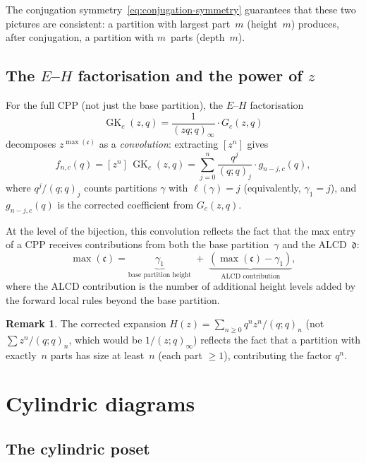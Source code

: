 \documentclass[11pt]{article}
\newcommand{\GK}{\operatorname{GK}}
\newcommand{\qpoch}[2]{(#1;#2)_\infty}
\newcommand{\qpochn}[3]{(#1;#2)_{#3}}
\theoremstyle{plain}
\theoremstyle{definition}
\newtheorem{remark}[theorem]{Remark}
\begin{document}
The conjugation symmetry~\eqref{eq:conjugation-symmetry} guarantees that
these two pictures are consistent: a partition with largest part~$m$
(height~$m$) produces, after conjugation, a partition with $m$~parts
(depth~$m$).

\subsection{The $E$--$H$ factorisation and the power of $z$}

For the full CPP (not just the base partition), the $E$--$H$ factorisation
\[
  \GK_c(z,q) = \frac{1}{\qpoch{zq}{q}} \cdot G_c(z,q)
\]
decomposes $z^{\max(\mathfrak{c})}$ as a \emph{convolution}: extracting
$[z^n]$ gives
\begin{equation}\label{eq:convolution}
  f_{n,c}(q) = [z^n]\,\GK_c(z,q)
  = \sum_{j=0}^{n} \frac{q^j}{\qpochn{q}{q}{j}} \cdot g_{n-j,c}(q),
\end{equation}
where $q^j/\qpochn{q}{q}{j}$ counts partitions $\gamma$ with
$\ell(\gamma) = j$ (equivalently, $\gamma_1 = j$), and $g_{n-j,c}(q)$
is the corrected coefficient from $G_c(z,q)$.

At the level of the bijection, this convolution reflects the fact that
the max entry of a CPP receives contributions from both the base
partition~$\gamma$ and the ALCD~$\mathfrak{d}$:
\[
  \max(\mathfrak{c}) = \underbrace{\gamma_1}_{\text{base partition height}}
  \;+\; \underbrace{(\max(\mathfrak{c}) - \gamma_1)}_{\text{ALCD contribution}},
\]
where the ALCD contribution is the number of additional height levels
added by the forward local rules beyond the base partition.

\begin{remark}
The corrected expansion $H(z) = \sum_{n \geq 0} q^n z^n/\qpochn{q}{q}{n}$
(not $\sum z^n/\qpochn{q}{q}{n}$, which would be $1/\qpoch{z}{q}$)
reflects the fact that a partition with exactly~$n$ parts has size at
least~$n$ (each part $\geq 1$), contributing the factor $q^n$.
\end{remark}


\section{Cylindric diagrams}
\label{sec:alcd}

\subsection{The cylindric poset}
\end{document}
